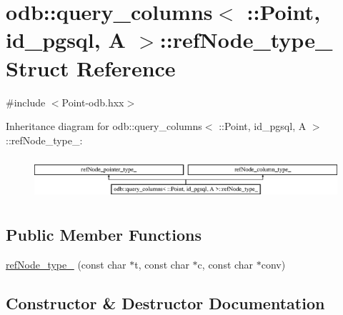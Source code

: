 \hypertarget{structodb_1_1query__columns_3_01_1_1_point_00_01id__pgsql_00_01_a_01_4_1_1ref_node__type__}{}\section{odb\+:\+:query\+\_\+columns$<$ \+:\+:Point, id\+\_\+pgsql, A $>$\+:\+:ref\+Node\+\_\+type\+\_\+ Struct Reference}
\label{structodb_1_1query__columns_3_01_1_1_point_00_01id__pgsql_00_01_a_01_4_1_1ref_node__type__}


{\ttfamily \#include $<$Point-\/odb.\+hxx$>$}

Inheritance diagram for odb\+:\+:query\+\_\+columns$<$ \+:\+:Point, id\+\_\+pgsql, A $>$\+:\+:ref\+Node\+\_\+type\+\_\+\+:\begin{figure}[H]
\begin{center}
\leavevmode
\includegraphics[height=1.586402cm]{dd/db6/structodb_1_1query__columns_3_01_1_1_point_00_01id__pgsql_00_01_a_01_4_1_1ref_node__type__}
\end{center}
\end{figure}
\subsection*{Public Member Functions}
\begin{DoxyCompactItemize}
\item 
\hyperlink{structodb_1_1query__columns_3_01_1_1_point_00_01id__pgsql_00_01_a_01_4_1_1ref_node__type___a203dab816e5751fb520d8f1f2c3b76b9}{ref\+Node\+\_\+type\+\_\+} (const char $\ast$t, const char $\ast$c, const char $\ast$conv)
\end{DoxyCompactItemize}


\subsection{Constructor \& Destructor Documentation}
\hypertarget{structodb_1_1query__columns_3_01_1_1_point_00_01id__pgsql_00_01_a_01_4_1_1ref_node__type___a203dab816e5751fb520d8f1f2c3b76b9}{}
